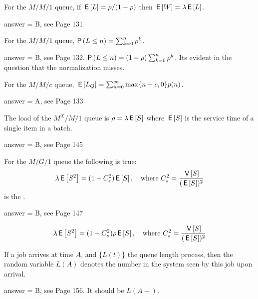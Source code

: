 \begin{exercise}[201803]
For the $M/M/1$ queue, if $\,\mathsf{E}\left[L\right] = \rho/(1-\rho)$ then $\,\mathsf{E}\left[W\right] = \lambda \,\mathsf{E}\left[L\right]$.
\begin{solution}
answer = B, see Page 131
\end{solution}
\end{exercise}

\begin{exercise}[201803]
For the $M/M/1$ queue, $\P{L\leq n} = \sum_{k=0}^n \rho^k$.
\begin{solution}
answer = B, see Page 132. $\P{L\leq n} = (1-\rho)\sum_{k=0}^n \rho^k$. Its evident in the question that the normalization misses.
\end{solution}
\end{exercise}

\begin{exercise}[201803]
For the $M/M/c$ queue, $\,\mathsf{E}\left[L_Q\right] = \sum_{n=0}^\infty \max\{n-c, 0\} p(n)$. 
\begin{solution}
answer = A, see Page 133
\end{solution}
\end{exercise}

\begin{exercise}[201803]
The load of the $M^X/M/1$ queue is $\rho = \lambda \,\mathsf{E}\left[S\right]$ where $\,\mathsf{E}\left[S\right]$ is the service time of a single item in a batch.
\begin{solution}
answer = B, see Page 145
\end{solution}
\end{exercise}

\begin{exercise}[201803]
For the $M/G/1$ queue the following is true:
\begin{equation}
  \lambda \,\mathsf{E}\left[S^2\right] = (1+C_s^2)\,\mathsf{E}\left[S\right], \quad\text{where } C_s^2 = \frac{\,\mathsf{V}\left[S\right] }{(\,\mathsf{E}\left[S\right])^2}
\end{equation}
is the .
\begin{solution}
answer = B, see Page 147

\begin{equation}
  \lambda \,\mathsf{E}\left[S^2\right] = (1+C_s^2)\rho\,\mathsf{E}\left[S\right], \quad\text{where }
 C_s^2 = \frac{\,\mathsf{V}\left[S\right] }{(\,\mathsf{E}\left[S\right])^2}
\end{equation}
\end{solution}
\end{exercise}

\begin{exercise}[201803]
If a job arrives at time $A$, and $\{L(t)\}$ the queue length process, then the random variable $L(A)$   denotes the number in the system seen by this job upon arrival.
\begin{solution}
answer = B, see Page 156. It should be $L(A-)$.
\end{solution}
\end{exercise}

